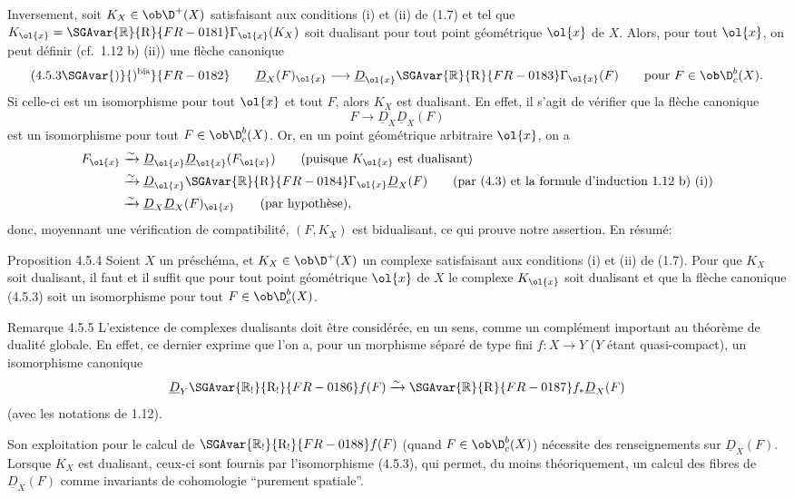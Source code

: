 Inversement, soit $K_X\in\ob\D^+(X)$ satisfaisant aux conditions (i) et (ii) de (1.7) et tel que $K_{\ol{x}}=\SGAvar{\mathbb{R}}{\mathrm{R}}{FR-0181}\Gamma_{\ol{x}}(K_X)$ soit dualisant pour tout point géométrique $\ol{x}$ de $X$. Alors, pour tout $\ol{x}$, on peut définir (cf.~1.12 b) (ii)) une flèche canonique
\[
(4.5.3\SGAvar{)}{)^{\mathrm{bis}}}{FR-0182}\qquad \underline{D}_X(F)_{\ol{x}}\longrightarrow \underline{D}_{\ol{x}}\SGAvar{\mathbb{R}}{\mathrm{R}}{FR-0183}\Gamma_{\ol{x}}(F)\qquad \text{pour } F\in\ob\D_c^b(X).
\]
Si celle-ci est un isomorphisme pour tout $\ol{x}$ et tout $F$, alors $K_X$ est dualisant. En effet, il s'agit de vérifier que la flèche canonique
\[
F\longrightarrow \underline{D}_X\underline{D}_X(F)
\]
est un isomorphisme pour tout $F\in\ob\D_c^b(X)$. Or, en un point géométrique arbitraire $\ol{x}$, on a
\[
\begin{aligned}
F_{\ol{x}}&\xrightarrow{\sim}\underline{D}_{\ol{x}}\underline{D}_{\ol{x}}(F_{\ol{x}})\qquad\text{(puisque $K_{\ol{x}}$ est dualisant)}\\
&\xrightarrow{\sim}\underline{D}_{\ol{x}}\SGAvar{\mathbb{R}}{\mathrm{R}}{FR-0184}\Gamma_{\ol{x}}\underline{D}_X(F)\qquad\text{(par (4.3) et la formule d'induction 1.12 b) (i))}\\
&\xrightarrow{\sim}\underline{D}_X\underline{D}_X(F)_{\ol{x}}\qquad\text{(par hypothèse)},
\end{aligned}
\]
donc, moyennant une vérification de compatibilité, $(F,K_X)$ est bidualisant, ce qui prouve notre assertion. En résumé:

\begin{statement}{Proposition 4.5.4}
Soient $X$ un préschéma, et $K_X\in\ob\D^+(X)$ un complexe satisfaisant aux conditions (i) et (ii) de (1.7). Pour que $K_X$ soit dualisant, il faut et il suffit que pour tout point géométrique $\ol{x}$ de $X$ le complexe $K_{\ol{x}}$ soit dualisant et que la flèche canonique (4.5.3) soit un isomorphisme pour tout $F\in\ob\D_c^b(X)$.
\end{statement}

\begin{statement}{Remarque 4.5.5}
L'existence de complexes dualisants doit être considérée, en un sens, comme un complément important au théorème de dualité globale. En effet, ce dernier exprime que l'on a, pour un morphisme séparé de type fini $f:X\to Y$ ($Y$ étant quasi-compact), un isomorphisme canonique
\[
\underline{D}_Y\SGAvar{\mathbb{R}_!}{\mathrm{R}_!}{FR-0186}f(F)\xrightarrow{\sim}\SGAvar{\mathbb{R}}{\mathrm{R}}{FR-0187} f_*\underline{D}_X(F)
\]
(avec les notations de 1.12).

Son exploitation pour le calcul de $\SGAvar{\mathbb{R}_!}{\mathrm{R}_!}{FR-0188}f(F)$ (quand $F\in\ob\D_c^b(X)$) nécessite des renseignements sur $\underline{D}_X(F)$. Lorsque $K_X$ est dualisant, ceux-ci sont fournis par l'isomorphisme (4.5.3), qui permet, du moins théoriquement, un calcul des fibres de $\underline{D}_X(F)$ comme invariants de cohomologie ``purement spatiale''.
\end{statement}

